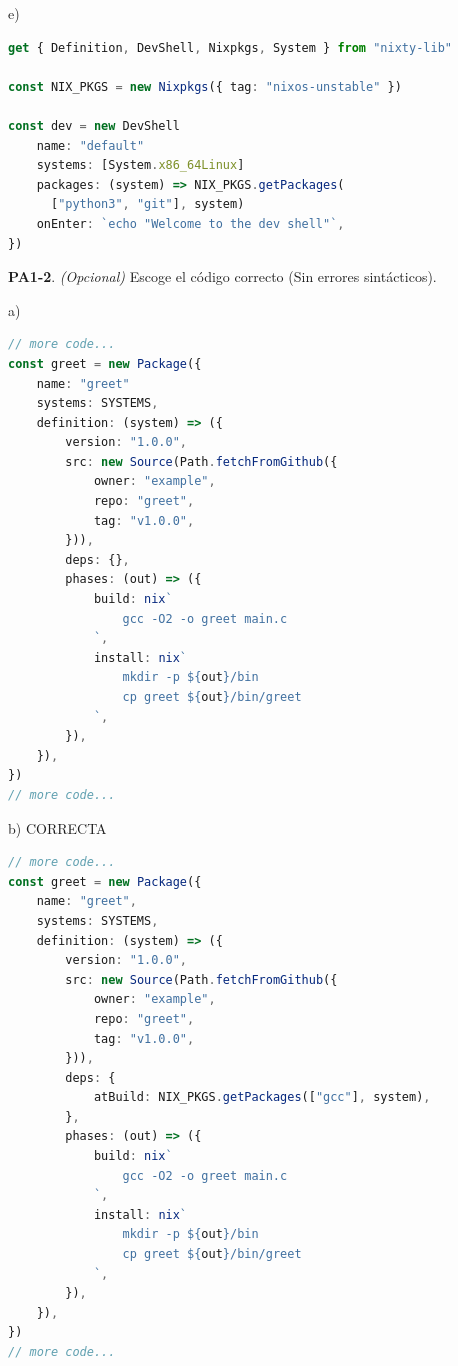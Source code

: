 \begin{opcion}{e)}
\begin{lstlisting}[language=TypeScript]
get { Definition, DevShell, Nixpkgs, System } from "nixty-lib"

const NIX_PKGS = new Nixpkgs({ tag: "nixos-unstable" })

const dev = new DevShell
    name: "default"
    systems: [System.x86_64Linux]
    packages: (system) => NIX_PKGS.getPackages(
      ["python3", "git"], system)
    onEnter: `echo "Welcome to the dev shell"`,
})
\end{lstlisting}
\end{opcion}

\textbf{PA1-2}. \emph{(Opcional)} Escoge el código correcto (Sin errores sintácticos).

\begin{opcion}{a)}
\begin{lstlisting}[language=TypeScript]
// more code...
const greet = new Package({
    name: "greet"
    systems: SYSTEMS,
    definition: (system) => ({
        version: "1.0.0",
        src: new Source(Path.fetchFromGithub({
            owner: "example",
            repo: "greet",
            tag: "v1.0.0",
        })),
        deps: {},
        phases: (out) => ({
            build: nix`
                gcc -O2 -o greet main.c
            `,
            install: nix`
                mkdir -p ${out}/bin
                cp greet ${out}/bin/greet
            `,
        }),
    }),
})
// more code...
\end{lstlisting}
\end{opcion}

\begin{opcion}{b)}
CORRECTA
\begin{lstlisting}[language=TypeScript]
// more code...
const greet = new Package({
    name: "greet",
    systems: SYSTEMS,
    definition: (system) => ({
        version: "1.0.0",
        src: new Source(Path.fetchFromGithub({
            owner: "example",
            repo: "greet",
            tag: "v1.0.0",
        })),
        deps: {
            atBuild: NIX_PKGS.getPackages(["gcc"], system),
        },
        phases: (out) => ({
            build: nix`
                gcc -O2 -o greet main.c
            `,
            install: nix`
                mkdir -p ${out}/bin
                cp greet ${out}/bin/greet
            `,
        }),
    }),
})
// more code...
\end{lstlisting}
\end{opcion}

